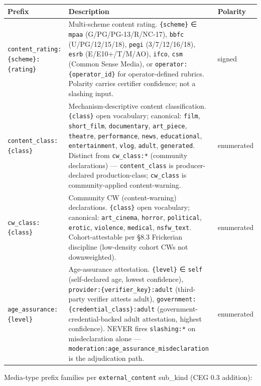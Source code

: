 \documentclass[10pt]{article}
\begin{document}
{\footnotesize
\begin{longtable}{|p{5.33cm}|p{5.33cm}|p{5.33cm}|}\hline
\textbf{Prefix} & \textbf{Description} & \textbf{Polarity} \\ \hline\endhead
\texttt{content\_rating:\{scheme\}:\{rating\}} & Multi-scheme content rating. \texttt{\{scheme\}} ∈ \texttt{mpaa} (G/PG/PG-13/R/NC-17), \texttt{bbfc} (U/PG/12/15/18), \texttt{pegi} (3/7/12/16/18), \texttt{esrb} (E/E10+/T/M/AO), \texttt{ifco}, \texttt{csm} (Common Sense Media), or \texttt{operator:\{operator\_id\}} for operator-defined rubrics. Polarity carries certifier confidence; not a slashing input. & signed \\ \hline
\texttt{content\_class:\{class\}} & Mechanism-descriptive content classification. \texttt{\{class\}} open vocabulary; canonical: \texttt{film}, \texttt{short\_film}, \texttt{documentary}, \texttt{art\_piece}, \texttt{theatre}, \texttt{performance}, \texttt{news}, \texttt{educational}, \texttt{entertainment}, \texttt{vlog}, \texttt{adult}, \texttt{generated}. Distinct from \texttt{cw\_class:*} (community declarations) — \texttt{content\_class} is producer-declared production-class; \texttt{cw\_class} is community-applied content-warning. & enumerated \\ \hline
\texttt{cw\_class:\{class\}} & Community CW (content-warning) declarations. \texttt{\{class\}} open vocabulary; canonical: \texttt{art\_cinema}, \texttt{horror}, \texttt{political}, \texttt{erotic}, \texttt{violence}, \texttt{medical}, \texttt{nsfw\_text}. Cohort-attestable per §8.3 Frickerian discipline (low-density cohort CWs not downweighted). & enumerated \\ \hline
\texttt{age\_assurance:\{level\}} & Age-assurance attestation. \texttt{\{level\}} ∈ \texttt{self} (self-declared age, lowest confidence), \texttt{provider:\{verifier\_key\}:adult} (third-party verifier attests adult), \texttt{government:\{credential\_class\}:adult} (government-credential-backed adult attestation, highest confidence). NEVER fires \texttt{slashing:*} on misdeclaration alone — \texttt{moderation:age\_assurance\_misdeclaration} is the adjudication path. & enumerated \\ \hline
\end{longtable}}


Media-type prefix families per \texttt{external\_content} sub\_kind (CEG 0.3 addition):
\end{document}

